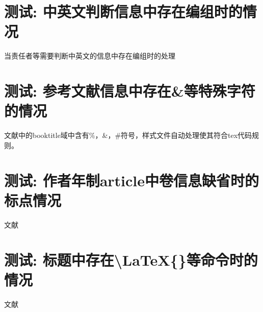 \documentclass[twoside]{article}
\begin{document}
    \section{测试: 中英文判断信息中存在编组时的情况}
\begin{refsection}
当责任者等需要判断中英文的信息中存在编组时的处理
\cite{IFLAI1977b--,IFLAI1977--}
\cite{r27-BenHadjAlaya-FekiA.2008-1-5,中国企业投资协会2014--,中国企业投资协会2015--}

\printbibliography[heading=subbibliography,title=【中英文判断信息中存在编组的测试】]
\end{refsection}


    \section{测试: 参考文献信息中存在\&等特殊字符的情况}
\begin{refsection}
文献中\cite{ref-replace-char}的booktitle域中含有\%，\&，\#符号，样式文件自动处理使其符合tex代码规则。
\printbibliography[heading=subbibliography,title=【处理参考文献信息中\&等特殊字符】]
\end{refsection}

\section{测试: 作者年制article中卷信息缺省时的标点情况}
\begin{refsection}
文献\cite{刘彻东1998-38-39}\cite{亚洲地质图编目组1978-194-208}
\cite{高光明1998-60-65}

\printbibliography[heading=subbibliography,title=【author-year style: article without volume】]
\end{refsection}

\section{测试: 标题中存在\textbackslash LaTeX\{\}等命令时的情况}

\begin{refsection}
文献\cite{Peebles2001-100-100}\cite{赵凯华1995--}\cite{蒋有绪1998--}

\printbibliography[heading=subbibliography,title=【title with \textbackslash LaTeX\{\}】]
\end{refsection}




    
\end{document}
